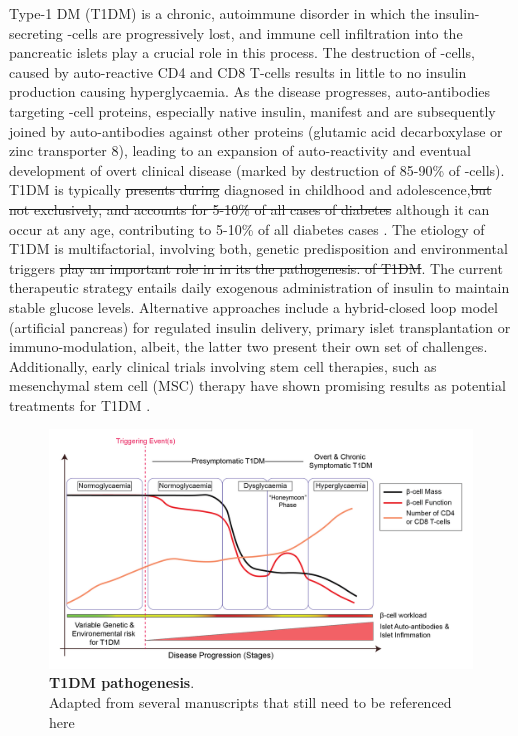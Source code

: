 Type-1 DM (T1DM) is a chronic, autoimmune disorder in which the insulin-secreting \textbeta-cells are progressively lost, and immune cell infiltration into the pancreatic islets play a crucial role in this process. The destruction of \textbeta-cells, caused by auto-reactive CD4 and CD8 T-cells results in little to no insulin production causing hyperglycaemia. As the disease progresses, auto-antibodies targeting \textbeta-cell proteins, especially native insulin, manifest and are subsequently joined by auto-antibodies against other proteins (glutamic acid decarboxylase or zinc transporter 8), leading to an expansion of auto-reactivity and eventual development of overt clinical disease (marked by destruction of 85-90\% of \textbeta-cells).
\newpage
T1DM is typically \st{presents during} diagnosed in childhood and adolescence,\st{but not exclusively, and accounts for 5-10\% of all cases of diabetes} although it can occur at any age, contributing to 5-10\% of all diabetes cases \textbf{\cite{banday_pathophysiology_2020}}. The etiology of T1DM is multifactorial, involving both, genetic predisposition and environmental triggers \st{play an important role in in its the pathogenesis. of T1DM}. The current therapeutic strategy entails daily exogenous administration of insulin to maintain stable glucose levels. Alternative approaches include a hybrid-closed loop model (artificial pancreas) for regulated insulin delivery, primary islet transplantation or immuno-modulation, albeit, the latter two present their own set of challenges. Additionally, early clinical trials involving stem cell therapies, such as mesenchymal stem cell (MSC) therapy have shown promising results as potential treatments for T1DM \textbf{\cite{pathak_therapies_2019}}.

\begin{figure}[t]
\centering
\includegraphics[width=16cm]{Chapter1/Fig/F1-3-02.png}
\caption[diabetes]{\textbf{T1DM pathogenesis}.\\
Adapted from several manuscripts that still need to be referenced here \textbf{\cite{chen_human_2017,von_herrath_type_2007,powers_type_2021}}}
\end{figure}


